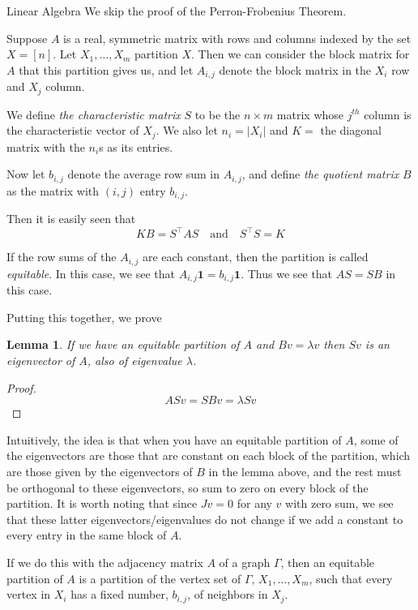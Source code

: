 \documentclass{article}
\newtheorem{lemma}{Lemma}
\begin{document}
\begin{section}{Linear Algebra}
  We skip the proof of the Perron-Frobenius Theorem.

  Suppose $A$ is a real, symmetric matrix with rows and columns indexed by the set $X = [n]$.
  Let $X_1, \ldots, X_m$ partition $X$.
  Then we can consider the block matrix for $A$ that this partition gives us, and let $A_{i,j}$ denote the block matrix in the $X_i$ row and $X_j$ column.
  
  We define \emph{the characteristic matrix} $S$ to be the $n \times m$ matrix whose $j^{th}$ column is the characteristic vector of $X_j$.
  We also let $n_i = |X_i|$ and $K =$ the diagonal matrix with the $n_i$s as its entries.

  Now let $b_{i,j}$ denote the average row sum in $A_{i,j}$, and define \emph{the quotient matrix} $B$ as the matrix with $(i,j)$ entry $b_{i,j}$.

  Then it is easily seen that
  $$
  KB = S^\intercal A S \quad \text{and} \quad S^\intercal S= K
  $$
  
  If the row sums of the $A_{i,j}$ are each constant, then the partition is called \emph{equitable}.
  In this case, we see that $A_{i,j} \mathbf 1 = b_{i,j} \mathbf 1$.
  Thus we see that $AS = SB$ in this case.

  Putting this together, we prove
  \begin{lemma}
    If we have an equitable partition of $A$ and $Bv = \lambda v$ then $Sv$ is an eigenvector of $A$, also of eigenvalue $\lambda$.
  \end{lemma}
  \begin{proof}
    $$ASv = SBv = \lambda Sv$$
  \end{proof}

  Intuitively, the idea is that when you have an equitable partition of $A$, some of the eigenvectors are those that are constant on each block of the partition, which are those given by
  the eigenvectors of $B$ in the lemma above, and the rest must be orthogonal to these eigenvectors, so sum to zero on every block of the partition.
  It is worth noting that since $Jv = 0$ for any $v$ with zero sum, we see that these latter eigenvectors/eigenvalues do not change if we add a constant to every entry in the same block of $A$.

  If we do this with the adjacency matrix $A$ of a graph $\Gamma$, then an equitable partition of $A$ is a partition of the vertex set of $\Gamma$, $X_1, \ldots, X_m$, such that every vertex in $X_i$ has a fixed number, $b_{i,j}$, of neighbors in $X_j$.


\end{section}
\end{document}
